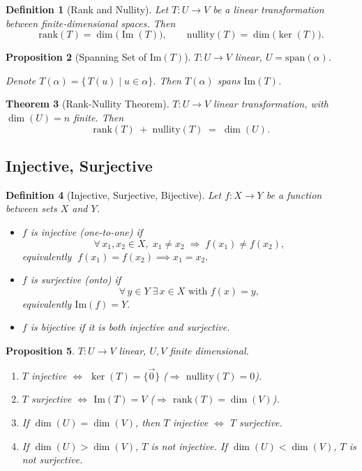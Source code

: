 \documentclass[12pt]{article}
\theoremstyle{break}             %
\newtheorem{thm}{Theorem}          %
\newtheorem{prop}[thm]{Proposition}%
\newtheorem{defn}[thm]{Definition}
\begin{document}
\begin{defn}[Rank and Nullity]
Let $T\colon U\to V$ be a linear transformation between finite‐dimensional spaces.  Then
\[
\mathrm{rank}(T)=\dim\bigl(\operatorname{Im}(T)\bigr),
\qquad
\mathrm{nullity}(T)=\dim\bigl(\ker(T)\bigr).
\]
\end{defn}

\begin{prop}[Spanning Set of $\mathrm{Im}(T)$]
\(T: U \to V\) linear, \(U = \mathrm{span}(\alpha)\).

Denote \(T(\alpha) = \{\,T(u) \mid u \in \alpha\}\).  
Then \(T(\alpha)\) spans \(\mathrm{Im}(T)\).
\end{prop}

\begin{thm}[Rank-Nullity Theorem]
\(T : U \to V\) linear transformation, with \(\dim(U) = n\) finite.  
Then 
\[
\mathrm{rank}(T) \;+\; \mathrm{nullity}(T) \;=\; \dim(U).
\]
\end{thm}

\subsection{Injective, Surjective}

\begin{defn}[Injective, Surjective, Bijective]
Let \(f: X \to Y\) be a function between sets \(X\) and \(Y\).
\begin{itemize}
  \item \(f\) is \emph{injective} (one-to-one) if
    \[
      \forall\,x_1,x_2\in X,\;x_1\neq x_2\;\Longrightarrow\;f(x_1)\neq f(x_2),
    \]
    equivalently \(\;f(x_1)=f(x_2)\implies x_1=x_2.\)
  \item \(f\) is \emph{surjective} (onto) if
    \[
      \forall\,y\in Y\;\exists\,x\in X\text{ with }f(x)=y,
    \]
    equivalently \(\mathrm{Im}(f)=Y.\)
  \item \(f\) is \emph{bijective} if it is both injective and surjective.
\end{itemize}
\end{defn}

\begin{prop}
\(T : U \to V\) linear, \(U, V\) finite dimensional.  
\begin{enumerate}
\item \(T\) injective \(\Longleftrightarrow\) \(\ker(T) = \{\vec{0}\}\)  
  (\(\Longrightarrow\) \(\mathrm{nullity}(T) = 0\)).
\item \(T\) surjective \(\Longleftrightarrow\) \(\mathrm{Im}(T) = V\)  
  (\(\Longrightarrow\) \(\mathrm{rank}(T) = \dim(V)\)).
\item If \(\dim(U) = \dim(V)\), then \(T\) injective \(\Longleftrightarrow\) \(T\) surjective.
\item If \(\dim(U) > \dim(V)\), \(T\) is not injective.  
  If \(\dim(U) < \dim(V)\), \(T\) is not surjective.
\end{enumerate}
\end{prop}
\end{document}
